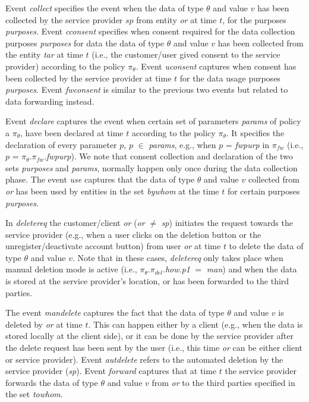 \documentclass[a4paper]{article}
\begin{document}
Event \textit{collect} specifies the event when the data of type $\theta$ and value $v$ has been collected by the service provider $sp$ from entity \textit{or} at time $t$,  for the purposes \textit{purposes}. Event \textit{cconsent} specifies when consent required for the data collection purposes \textit{purposes} for data the data of type $\theta$ and value $v$ has been collected from the entity \textit{tar} at time $t$ (i.e., the customer/user gived consent to the service provider) according to the policy $\pi_{\theta}$. Event \textit{uconsent} captures when consent has been collected by the service provider at time $t$ for the data usage purposes \textit{purposes}. Event \textit{fwconsent} is similar to the previous two events but related to data forwarding instead.  

Event \textit{declare} captures the event when certain set of parameters \textit{params} of policy a $\pi_{\theta}$,  have been declared at time $t$ according to the policy $\pi_{\theta}$. It specifies the declaration of  every parameter $p$, $p$ $\in$ \textit{params}, e.g., when $p$ = \textit{fwpurp} in $\pi_{fw}$ (i.e., $p$ = $\pi_{\theta}$.$\pi_{fw}$.\textit{fwpurp}).  We note that consent collection and declaration of the two sets \textit{purposes} and \textit{params}, normally happen only once during the data collection phase. The event \textit{use} captures that the data of type $\theta$ and value $v$ collected from   \textit{or} has been used  by entities in the set \textit{bywhom} at the time $t$ for certain purposes \textit{purposes}.    

In \textit{deletereq} the customer/client \textit{or} (\textit{or} $\neq$ \textit{sp}) initiates the request towards the service provider (e.g., when a user clicks on the deletion button or the unregister/deactivate account button) from user \textit{or} at time $t$ to delete the data of type $\theta$ and value $v$.  Note that in these cases,  \textit{deletereq} only takes place when manual deletion mode is active (i.e., $\pi_{\theta}$.$\pi_{del}$.\textit{how}.\textit{p1} $=$ \textit{man}) and when the data is stored at the service provider's location, or has been forwarded to the third parties.

The event 
\textit{mandelete} captures the fact that the data of type $\theta$ and value $v$ is deleted by \textit{or} at time $t$. This can happen either by a client (e.g., when the data is stored locally at the client side), or it can be done by the service provider after the delete request has been sent by the user (i.e., this time \textit{or} can be either client or service provider).  Event \textit{autdelete} refers to the automated deletion by the service provider (\textit{sp}). Event 
\textit{forward} captures that at time $t$ the service provider forwards the data of type $\theta$ and value $v$ from \textit{or} to the third parties specified in the set \textit{towhom}. 
\end{document}
